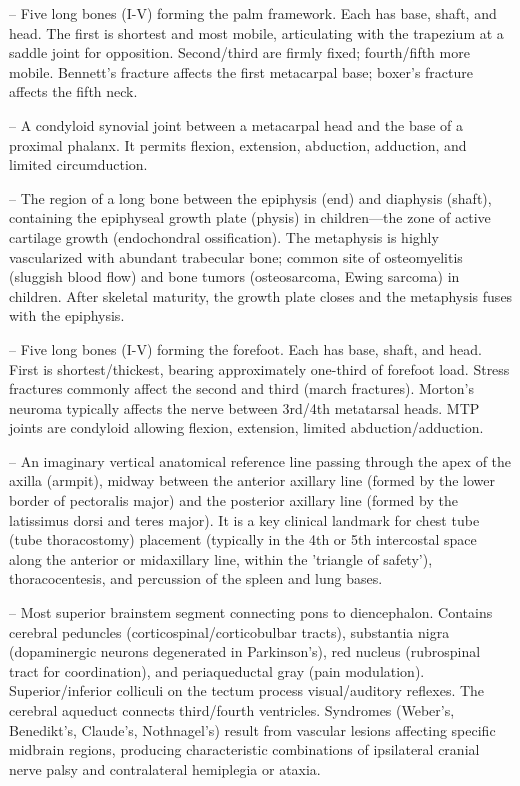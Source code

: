 -- Five long bones (I-V) forming the palm framework. Each has base, shaft, and head. The first is shortest and most mobile, articulating with the trapezium at a saddle joint for opposition. Second/third are firmly fixed; fourth/fifth more mobile. Bennett's fracture affects the first metacarpal base; boxer's fracture affects the fifth neck.

-- A condyloid synovial joint between a metacarpal head and the base of a proximal phalanx. It permits flexion, extension, abduction, adduction, and limited circumduction.

-- The region of a long bone between the epiphysis (end) and diaphysis (shaft), containing the epiphyseal growth plate (physis) in children—the zone of active cartilage growth (endochondral ossification). The metaphysis is highly vascularized with abundant trabecular bone; common site of osteomyelitis (sluggish blood flow) and bone tumors (osteosarcoma, Ewing sarcoma) in children. After skeletal maturity, the growth plate closes and the metaphysis fuses with the epiphysis.

-- Five long bones (I-V) forming the forefoot. Each has base, shaft, and head. First is shortest/thickest, bearing approximately one-third of forefoot load. Stress fractures commonly affect the second and third (march fractures). Morton's neuroma typically affects the nerve between 3rd/4th metatarsal heads. MTP joints are condyloid allowing flexion, extension, limited abduction/adduction.

-- An imaginary vertical anatomical reference line passing through the apex of the axilla (armpit), midway between the anterior axillary line (formed by the lower border of pectoralis major) and the posterior axillary line (formed by the latissimus dorsi and teres major). It is a key clinical landmark for chest tube (tube thoracostomy) placement (typically in the 4th or 5th intercostal space along the anterior or midaxillary line, within the 'triangle of safety'), thoracocentesis, and percussion of the spleen and lung bases.

-- Most superior brainstem segment connecting pons to diencephalon. Contains cerebral peduncles (corticospinal/corticobulbar tracts), substantia nigra (dopaminergic neurons degenerated in Parkinson's), red nucleus (rubrospinal tract for coordination), and periaqueductal gray (pain modulation). Superior/inferior colliculi on the tectum process visual/auditory reflexes. The cerebral aqueduct connects third/fourth ventricles. Syndromes (Weber's, Benedikt's, Claude's, Nothnagel's) result from vascular lesions affecting specific midbrain regions, producing characteristic combinations of ipsilateral cranial nerve palsy and contralateral hemiplegia or ataxia.

